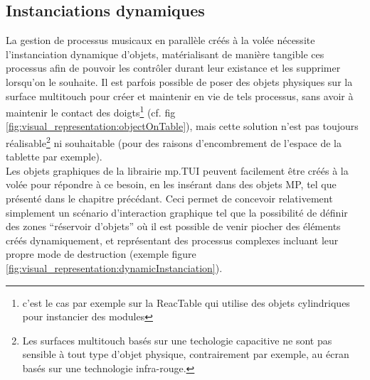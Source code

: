 

\subsection{Instanciations dynamiques}

\noindent La gestion de processus musicaux en parallèle créés à la volée nécessite l'instanciation dynamique d'objets, matérialisant de manière tangible ces processus afin de pouvoir les contrôler durant leur existance et les supprimer lorsqu'on le souhaite.
\indent Il est parfois possible de poser des objets physiques sur la surface multitouch pour créer et maintenir en vie de tels processus, sans avoir à maintenir le contact des doigts\footnote{c'est le cas par exemple sur la ReacTable qui utilise des objets cylindriques pour instancier des modules} (cf. fig \ref{fig:visual_representation:objectOnTable}), mais cette solution n'est pas toujours réalisable\footnote{Les surfaces multitouch basés sur une techologie capacitive ne sont pas sensible à tout type d'objet physique, contrairement par exemple, au écran basés sur une technologie infra-rouge.} ni souhaitable (pour des raisons d'encombrement de l'espace de la tablette par exemple).\\
\indent Les objets graphiques de la librairie mp.TUI peuvent facilement être créés à la volée pour répondre à ce besoin, en les insérant dans des objets MP, tel que présenté dans le chapitre précédant. Ceci permet de concevoir relativement simplement un scénario d'interaction graphique tel que la possibilité de définir des zones ``réservoir d'objets'' où il est possible de venir piocher des éléments créés dynamiquement, et représentant des processus complexes incluant leur propre mode de destruction (exemple figure \ref{fig:visual_representation:dynamicInstanciation}).

